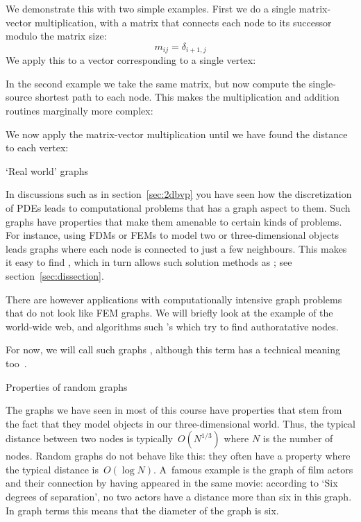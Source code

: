 We demonstrate this with two simple examples.
First we do a single matrix-vector multiplication,
with a matrix that connects each node to its successor
modulo the matrix size:
\[ m_{ij} = \delta_{i+1,j} \]
We apply this to a vector corresponding to a single vertex:
%

In the second example we take the same matrix,
but now compute the single-source shortest path to each node.
This makes the multiplication and addition routines
marginally more complex:
%

We now apply the matrix-vector multiplication
until we have found the distance to each vertex:
%

 {`Real world' graphs}

In discussions such as in section~\ref{sec:2dbvp} you have seen how
the discretization of \acp{PDE} leads to computational problems that
has a graph aspect to them. Such graphs have properties that make them
amenable to certain kinds of problems.
%
For instance, using \acp{FDM} or \acp{FEM} to model two or
three-dimensional objects leads graphs where each node is connected to
just a few neighbours. This makes it easy to find
, which in turn allows such solution methods as
; see section~\ref{sec:dissection}.

There are however applications with computationally intensive graph
problems that do not look like \ac{FEM} graphs. We will briefly look
at the example of the world-wide web, and algorithms such
's  which try to find
authoratative nodes.

For now, we will call such graphs ,
although this term has a technical meaning
too~\cite{Erdos:randomgraph}.

 {Properties of random graphs}

The graphs we have seen in most of this course have properties that
stem from the fact that they model objects in our three-dimensional
world. Thus, the typical distance between two nodes is
typically~$O(N^{1/3})$ where $N$ is the number of nodes. Random graphs
do not behave like this: they often have a 
property where the typical distance is~$O(\log N)$. A~famous example
is the graph of film actors and their connection by having appeared in
the same movie: according to `Six degrees of separation', no two actors
have a distance more than six in this graph. In graph terms this means
that the diameter of the graph is six.


